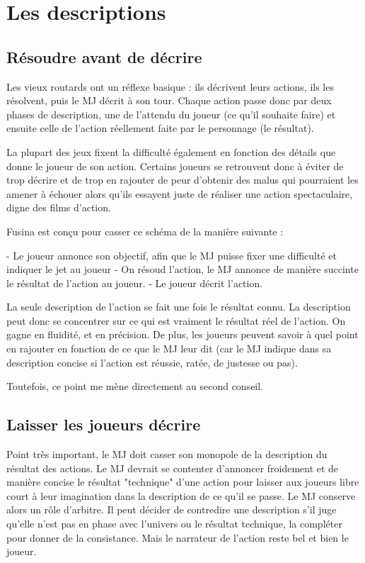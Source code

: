 \chapter{Les descriptions}

\section{Résoudre avant de décrire}

Les vieux routards ont un réflexe basique : ils décrivent leurs actions, ils les résolvent, puis le MJ décrit à son tour. Chaque action passe donc par deux phases de description, une de l'attendu du joueur (ce qu'il souhaite faire) et ensuite celle de l'action réellement faite par le personnage (le résultat). 

La plupart des jeux fixent la difficulté également en fonction des détails que donne le joueur de son action. Certains joueurs se retrouvent donc à éviter de trop décrire et de trop en rajouter de peur d'obtenir des malus qui pourraient les amener à échouer alors qu'ils essayent juste de réaliser une action spectaculaire, digne des films d'action.

Fusina est conçu pour casser ce schéma de la manière suivante :


- Le joueur annonce son objectif, afin que le MJ puisse fixer une difficulté et indiquer le jet au joueur
- On résoud l'action, le MJ annonce de manière succinte le résultat de l'action au joueur.
- Le joueur décrit l'action.


La seule description de l'action se fait une fois le résultat connu. La description peut donc se concentrer sur ce qui est vraiment le résultat réel de l'action. On gagne en fluidité, et en précision. De plus, les joueurs peuvent savoir à quel point en rajouter en fonction de ce que le MJ leur dit (car le MJ indique dans sa description concise si l'action est réussie, ratée, de justesse ou pas).

Toutefois, ce point me mène directement au second conseil.

\section{Laisser les joueurs décrire}

Point très important, le MJ doit casser son monopole de la description du résultat des actions. Le MJ devrait se contenter d'annoncer froidement et de manière concise le résultat "technique" d'une action pour laisser aux joueurs libre court à leur imagination dans la description de ce qu'il se passe. Le MJ conserve alors un rôle d'arbitre. Il peut décider de contredire une description s'il juge qu'elle n'est pas en phase avec l'univers ou le résultat technique, la compléter pour donner de la consistance. Mais le narrateur de l'action reste bel et bien le joueur.

